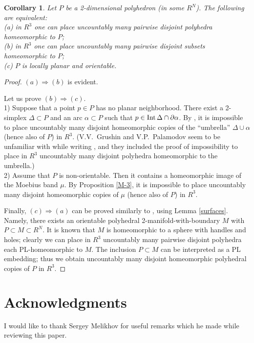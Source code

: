 \documentclass[12pt]{article}
\newtheorem{corollary}[theorem]{Corollary}
\theoremstyle{definition}
\begin{document}
\begin{corollary}\label{M-3-criterion}
Let $P$ be a 2-dimensional polyhedron (in some
$R^N$).
The following are equivalent:
\\
(a)
in $R^3$ one can place
uncountably many
pairwise disjoint polyhedra
homeomorphic to $P$;
\\
(b)
in $R^3$ one can place
uncountably many
pairwise disjoint subsets
homeomorphic to $P$;
\\
(c) 
$P$ is locally planar and orientable.
\end{corollary}


\begin{proof}
$(a)\Rightarrow (b)$ is evident.

Let us prove $(b)\Rightarrow (c)$.
\\
1) Suppose that a point $p\in P$
has no planar neighborhood.
There exist a 2-simplex $\Delta \subset P$
and an arc $\alpha \subset P$ such that
$p\in \operatorname{Int} \Delta  \cap \partial \alpha $.
By \cite{Young},
it is impossible to place uncountably many
disjoint
homeomorphic copies of the ``umbrella''
$\Delta \cup \alpha $ (hence also of $P$) 
in $R^3$.
(V.V.~Grushin and V.P.~Palamodov seem
to be unfamiliar with \cite{Young} while writing \cite{GP}, and they included the proof
of impossibility to place in $R^3$
uncountably many disjoint polyhedra
homeomorphic to the umbrella.)
\\
2) Assume that $P$ is non-orientable.
Then it contains a 
homeomorphic image of the Moebius band $\mu $.
By Proposition \ref{M-3}, it is
impossible to place uncountably many
disjoint
homeomorphic copies of $\mu $ 
(hence also of $P$) in $R^3$.

Finally, $(c)\Rightarrow (a)$
can be proved similarly to \cite{GP},
using Lemma \ref{surfaces}.
Namely,
there exists an orientable polyhedral 
2-manifold-with-boundary $M$ with
$P\subset M \subset R^N$.
It is known that $M$ is homeomorphic
to a sphere with handles and holes;
clearly we can place in $R^3$
uncountably many pairwise disjoint
polyhedra each PL-homeomorphic to $M$.
The inclusion $P\subset M$
can be interpreted as a PL embedding;
thus we obtain
uncountably many
disjoint homeomorphic polyhedral
copies of $P$ in $R^3$.
\end{proof}

\section*{Acknowledgments}

I would like to thank Sergey Melikhov
for useful remarks which
he made while reviewing this paper.
\end{document}
